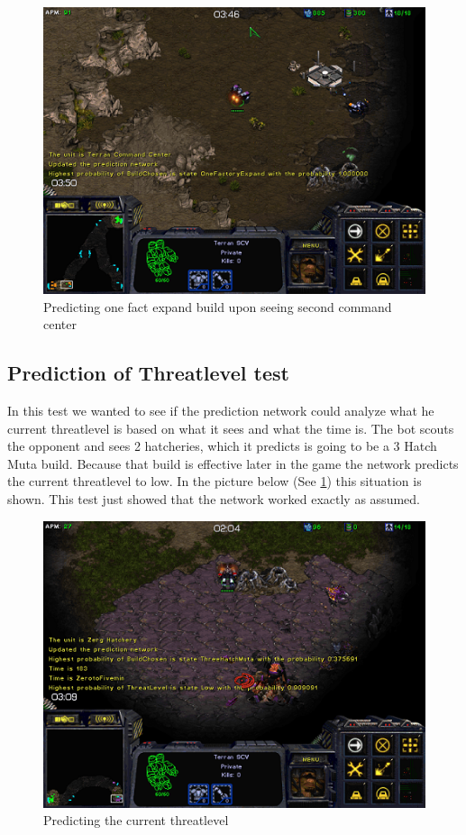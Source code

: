 	\begin{figure}[H]
		\begin{center}
		\includegraphics[scale=0.7]{Figures/BuildOrderPredictorTest/Predicting.png}
		\caption{Predicting one fact expand build upon seeing second command center}\label{fig:predicting}
		\end{center}
	\end{figure}
	\subsection{Prediction of Threatlevel test}
		In this test we wanted to see if the prediction network could analyze what he current threatlevel is based on what it sees and what the time is.
		The bot scouts the opponent and sees 2 hatcheries, which it predicts is going to be a 3 Hatch Muta build. Because that build is effective later 
		in the game the network predicts the current threatlevel to low. In the picture below (See \ref{fig:predicting}) this situation is shown. 
		This test just showed that the network worked exactly as assumed.
		\begin{figure}[H]
			\begin{center}
			\includegraphics[scale=0.7]{Figures/BuildOrderPredictorTest/threatlevel.png}
			\caption{Predicting the current threatlevel}\label{fig:threatlevel}
			\end{center}
		\end{figure}